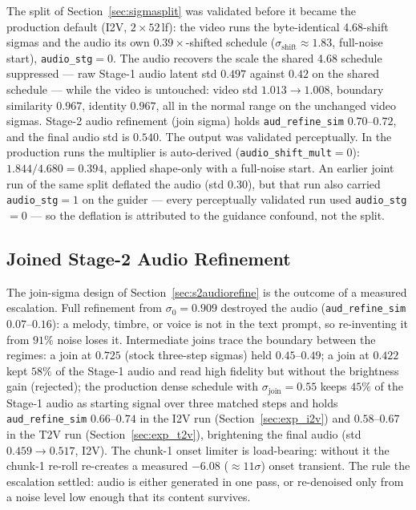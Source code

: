 \documentclass[12pt]{article}
\begin{document}
The split of Section~\ref{sec:sigmasplit} was validated before it became the
production default (I2V, $2\times52$\,lf): the video runs the byte-identical
4.68-shift sigmas and the audio its own $0.39\times$-shifted schedule
($\sigma_{\text{shift}}\approx1.83$, full-noise start),
\texttt{audio\_stg}$=0$.  The audio recovers the scale the shared 4.68
schedule suppressed --- raw Stage-1 audio latent std $0.497$ against $0.42$
on the shared schedule --- while the video is untouched: video std
$1.013\to1.008$, boundary similarity $0.967$, identity $0.967$, all in the
normal range on the unchanged video sigmas.  Stage-2 audio refinement
(join sigma) holds \texttt{aud\_refine\_sim} $0.70$--$0.72$, and the final
audio std is $0.540$.  The output was validated perceptually.  In the
production runs the multiplier is auto-derived (\texttt{audio\_shift\_mult}$=0$):
$1.844/4.680=0.394$, applied shape-only with a full-noise start.  An earlier
joint run of the same split deflated the audio (std $0.30$), but that run
also carried \texttt{audio\_stg}$=1$ on the guider --- every perceptually
validated run used \texttt{audio\_stg}$=0$ --- so the deflation is
attributed to the guidance confound, not the split.

\subsection{Joined Stage-2 Audio Refinement}
\label{sec:exp_join}

The join-sigma design of Section~\ref{sec:s2audiorefine} is the outcome of a
measured escalation.  Full refinement from $\sigma_0=0.909$ destroyed the
audio (\texttt{aud\_refine\_sim} $0.07$--$0.16$): a melody, timbre, or voice
is not in the text prompt, so re-inventing it from $91\%$ noise loses it.
Intermediate joins trace the boundary between the regimes: a join at
$0.725$ (stock three-step sigmas) held $0.45$--$0.49$; a join at $0.422$
kept $58\%$ of the Stage-1 audio and read high fidelity but without the
brightness gain (rejected); the production dense schedule with
$\sigma_{\text{join}}=0.55$ keeps $45\%$ of the Stage-1 audio as starting
signal over three matched steps and holds \texttt{aud\_refine\_sim}
$0.66$--$0.74$ in the I2V run (Section~\ref{sec:exp_i2v}) and $0.58$--$0.67$
in the T2V run (Section~\ref{sec:exp_t2v}), brightening the final audio (std $0.459\to0.517$,
I2V).  The chunk-1 onset limiter is load-bearing: without it the chunk-1
re-roll re-creates a measured $-6.08$ ($\approx11\sigma$) onset transient.
The rule the escalation settled: audio is either generated in one pass, or
re-denoised only from a noise level low enough that its content survives.
\end{document}

